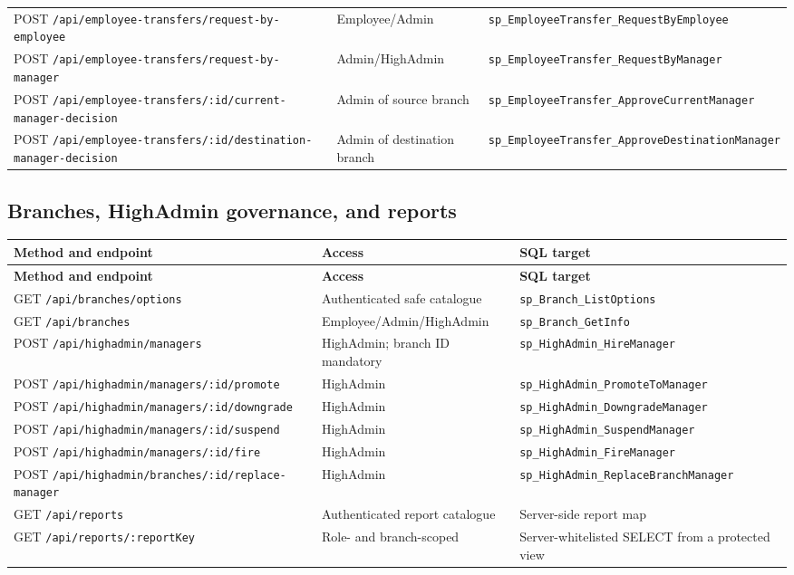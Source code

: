 \documentclass[11pt,a4paper,oneside]{report}
\begin{document}
{\begin{longtable}{L{0.40\textwidth}L{0.27\textwidth}L{0.24\textwidth}}
POST \nolinkurl{/api/employee-transfers/request-by-employee} & Employee/Admin & \nolinkurl{sp_EmployeeTransfer_RequestByEmployee}\\
POST \nolinkurl{/api/employee-transfers/request-by-manager} & Admin/HighAdmin & \nolinkurl{sp_EmployeeTransfer_RequestByManager}\\
POST \nolinkurl{/api/employee-transfers/:id/current-manager-decision} & Admin of source branch & \nolinkurl{sp_EmployeeTransfer_ApproveCurrentManager}\\
POST \nolinkurl{/api/employee-transfers/:id/destination-manager-decision} & Admin of destination branch & \nolinkurl{sp_EmployeeTransfer_ApproveDestinationManager}\\
\bottomrule
\end{longtable}

\subsection{Branches, HighAdmin governance, and reports}
\begin{longtable}{L{0.40\textwidth}L{0.27\textwidth}L{0.24\textwidth}}
\toprule\textbf{Method and endpoint} & \textbf{Access} & \textbf{SQL target}\\\midrule\endfirsthead
\toprule\textbf{Method and endpoint} & \textbf{Access} & \textbf{SQL target}\\\midrule\endhead
GET \nolinkurl{/api/branches/options} & Authenticated safe catalogue & \nolinkurl{sp_Branch_ListOptions}\\
GET \nolinkurl{/api/branches} & Employee/Admin/HighAdmin & \nolinkurl{sp_Branch_GetInfo}\\
POST \nolinkurl{/api/highadmin/managers} & HighAdmin; branch ID mandatory & \nolinkurl{sp_HighAdmin_HireManager}\\
POST \nolinkurl{/api/highadmin/managers/:id/promote} & HighAdmin & \nolinkurl{sp_HighAdmin_PromoteToManager}\\
POST \nolinkurl{/api/highadmin/managers/:id/downgrade} & HighAdmin & \nolinkurl{sp_HighAdmin_DowngradeManager}\\
POST \nolinkurl{/api/highadmin/managers/:id/suspend} & HighAdmin & \nolinkurl{sp_HighAdmin_SuspendManager}\\
POST \nolinkurl{/api/highadmin/managers/:id/fire} & HighAdmin & \nolinkurl{sp_HighAdmin_FireManager}\\
POST \nolinkurl{/api/highadmin/branches/:id/replace-manager} & HighAdmin & \nolinkurl{sp_HighAdmin_ReplaceBranchManager}\\
GET \nolinkurl{/api/reports} & Authenticated report catalogue & Server-side report map\\
GET \nolinkurl{/api/reports/:reportKey} & Role- and branch-scoped & Server-whitelisted SELECT from a protected view\\
\bottomrule
\end{longtable}
}
\end{document}
